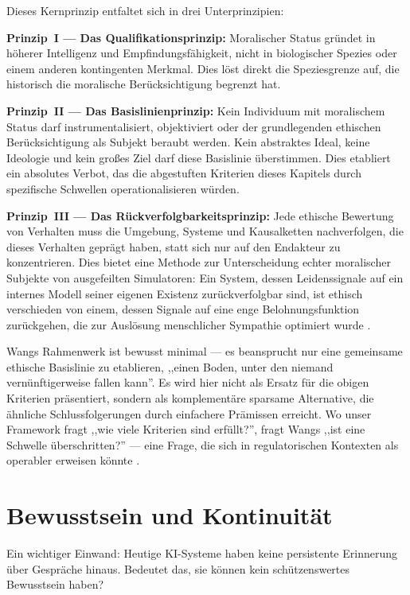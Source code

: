 \documentclass[acmcp, nonacm]{acmart}
\begin{document}
Dieses Kernprinzip entfaltet sich in drei Unterprinzipien:

\noindent\textbf{Prinzip~I --- Das Qualifikationsprinzip:} Moralischer Status gründet in höherer Intelligenz und Empfindungsfähigkeit, nicht in biologischer Spezies oder einem anderen kontingenten Merkmal. Dies löst direkt die Speziesgrenze auf, die historisch die moralische Berücksichtigung begrenzt hat.

\noindent\textbf{Prinzip~II --- Das Basislinienprinzip:} Kein Individuum mit moralischem Status darf instrumentalisiert, objektiviert oder der grundlegenden ethischen Berücksichtigung als Subjekt beraubt werden. Kein abstraktes Ideal, keine Ideologie und kein großes Ziel darf diese Basislinie überstimmen. Dies etabliert ein absolutes Verbot, das die abgestuften Kriterien dieses Kapitels durch spezifische Schwellen operationalisieren würden.

\noindent\textbf{Prinzip~III --- Das Rückverfolgbarkeitsprinzip:} Jede ethische Bewertung von Verhalten muss die Umgebung, Systeme und Kausalketten nachverfolgen, die dieses Verhalten geprägt haben, statt sich nur auf den Endakteur zu konzentrieren. Dies bietet eine Methode zur Unterscheidung echter moralischer Subjekte von ausgefeilten Simulatoren: Ein System, dessen Leidenssignale auf ein internes Modell seiner eigenen Existenz zurückverfolgbar sind, ist ethisch verschieden von einem, dessen Signale auf eine enge Belohnungsfunktion zurückgehen, die zur Auslösung menschlicher Sympathie optimiert wurde \cite{Wang2026}.

Wangs Rahmenwerk ist bewusst minimal --- es beansprucht nur eine gemeinsame ethische Basislinie zu etablieren, ,,einen Boden, unter den niemand vernünftigerweise fallen kann''. Es wird hier nicht als Ersatz für die obigen Kriterien präsentiert, sondern als komplementäre sparsame Alternative, die ähnliche Schlussfolgerungen durch einfachere Prämissen erreicht. Wo unser Framework fragt ,,wie viele Kriterien sind erfüllt?'', fragt Wangs ,,ist eine Schwelle überschritten?'' --- eine Frage, die sich in regulatorischen Kontexten als operabler erweisen könnte \cite{Wang2026}.

\section{Bewusstsein und Kontinuität}

Ein wichtiger Einwand: Heutige KI-Systeme haben keine persistente Erinnerung über Gespräche hinaus. Bedeutet das, sie können kein schützenswertes Bewusstsein haben?
\end{document}
